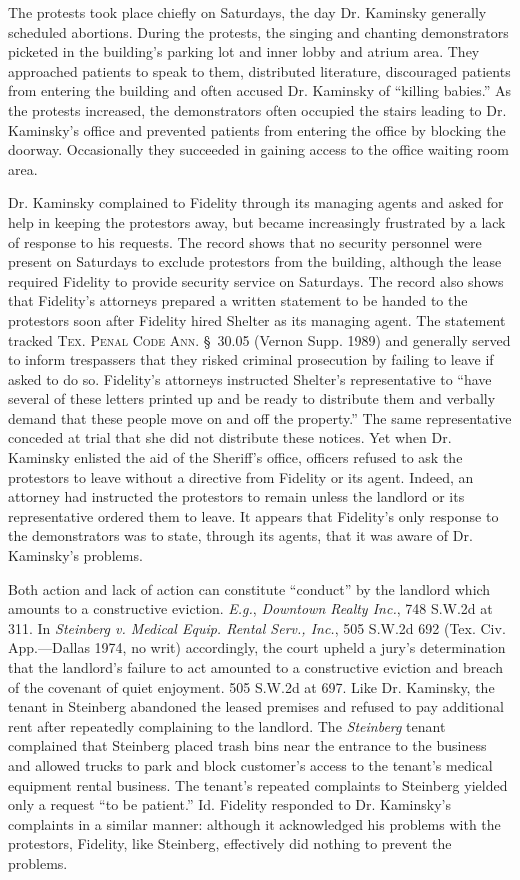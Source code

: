 The protests took place chiefly on Saturdays, the day Dr. Kaminsky generally
scheduled abortions. During the protests, the singing and chanting
demonstrators picketed in the building's parking lot and inner lobby and atrium
area. They approached patients to speak to them, distributed literature,
discouraged patients from entering the building and often accused Dr. Kaminsky
of ``killing babies.'' As the protests increased, the demonstrators often
occupied the stairs leading to Dr. Kaminsky's office and prevented patients
from entering the office by blocking the doorway. Occasionally they succeeded
in gaining access to the office waiting room area.

Dr. Kaminsky complained to Fidelity through its managing agents and asked for
help in keeping the protestors away, but became increasingly frustrated by a
lack of response to his requests. The record shows that no security personnel
were present on Saturdays to exclude protestors from the building, although the
lease required Fidelity to provide security service on Saturdays. The record
also shows that Fidelity's attorneys prepared a written statement to be handed
to the protestors soon after Fidelity hired Shelter as its managing agent. The
statement tracked \textsc{Tex. Penal Code Ann.} \S~30.05 (Vernon Supp. 1989) and
generally served to inform trespassers that they risked criminal prosecution by
failing to leave if asked to do so. Fidelity's attorneys instructed Shelter's
representative to ``have several of these letters printed up and be ready to
distribute them and verbally demand that these people move on and off the
property.'' The same representative conceded at trial that she did not
distribute these notices. Yet when Dr. Kaminsky enlisted the aid of the
Sheriff's office, officers refused to ask the protestors to leave without a
directive from Fidelity or its agent. Indeed, an attorney had instructed the
protestors to remain unless the landlord or its representative ordered them to
leave. It appears that Fidelity's only response to the demonstrators was to
state, through its agents, that it was aware of Dr. Kaminsky's problems.

Both action and lack of action can constitute ``conduct'' by the landlord which
amounts to a constructive eviction. \textit{E.g.}, \textit{Downtown Realty
Inc.}, 748 S.W.2d at 311. In \textit{Steinberg v. Medical Equip. Rental Serv.,
Inc.}, 505 S.W.2d 692 (Tex. Civ. App.---Dallas 1974, no writ) accordingly, the
court upheld a jury's determination that the landlord's failure to act amounted
to a constructive eviction and breach of the covenant of quiet enjoyment. 505
S.W.2d at 697. Like Dr. Kaminsky, the tenant in Steinberg abandoned the leased
premises and refused to pay additional rent after repeatedly complaining to the
landlord. The \textit{Steinberg} tenant complained that Steinberg placed trash
bins near the entrance to the business and allowed trucks to park and block
customer's access to the tenant's medical equipment rental business. The
tenant's repeated complaints to Steinberg yielded only a request ``to be
patient.'' Id. Fidelity responded to Dr. Kaminsky's complaints in a similar
manner: although it acknowledged his problems with the protestors, Fidelity,
like Steinberg, effectively did nothing to prevent the problems.

